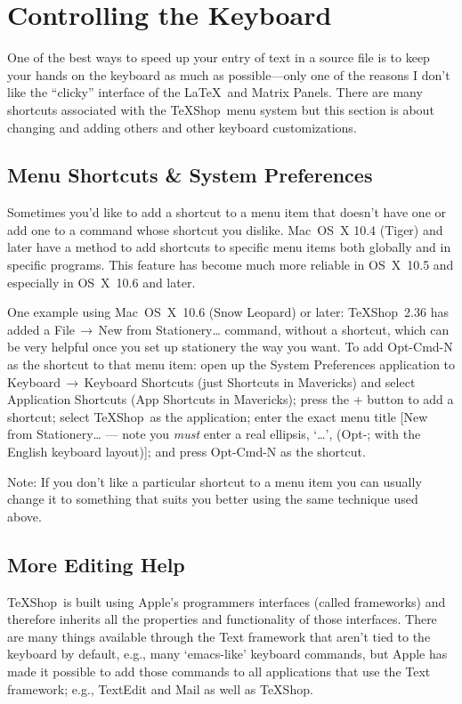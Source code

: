 \documentclass[letterpaper,11pt]{article}
\newcommand{\TS}{\textsf{\TeX Shop}}
\newcommand{\cmd}[1]{\textsf{#1}}
\newcommand{\mnu}[1]{\textsf{#1}}
\newcommand{\To}{\,\(\to\)\,}
\begin{document}
\section{Controlling the Keyboard}

One of the best ways to speed up your entry of text in a source file is to keep your hands on the keyboard as much as possible---only one of the reasons I don't like the ``clicky'' interface of the \LaTeX\ and Matrix Panels. There are many shortcuts associated with the \TS\ menu system but this section is about changing and adding others and other keyboard customizations.

\subsection{Menu Shortcuts \& System Preferences}

Sometimes you'd like to add a shortcut to a menu item that doesn't have one or add one to a command whose shortcut you dislike. Mac~OS~X 10.4 (Tiger) and later have a method to add shortcuts to specific menu items both globally and in specific programs. This feature has become much more reliable in OS~X~10.5 and especially in OS~X~10.6 and later.

One example using Mac~OS~X~10.6 (Snow Leopard) or later: \TS\ 2.36 has added a \mnu{File}\To\mnu{New from Stationery…} command, without a shortcut, which can be very helpful once you set up stationery the way you want. To add \cmd{Opt-Cmd-N} as the shortcut to that menu item: open up the \textsf{System Preferences} application to \mnu{Keyboard}\To\mnu{Keyboard Shortcuts} (just \mnu{Shortcuts} in \cmd{Mavericks}) and select \mnu{Application Shortcuts} (\mnu{App Shortcuts} in \cmd{Mavericks}); press the \mnu{+} button to add a shortcut; select \TS\ as the application; enter the exact menu title [\mnu{New from Stationery…} --- note you \emph{must} enter a real ellipsis, `…', (\cmd{Opt-;} with the English keyboard layout)]; and press \cmd{Opt-Cmd-N} as the shortcut.

Note: If you don't like a particular shortcut to a menu item you can usually change it to something that suits you better using the same technique used above.

\subsection{More Editing Help}

\TS\ is built using Apple's programmers interfaces (called frameworks) and therefore inherits all the properties and functionality of those interfaces. There are many things available through the Text framework that aren't tied to the keyboard by default, e.g., many `\cmd{emacs}-like' keyboard commands, but Apple has made it possible to add those commands to all applications that use the Text framework; e.g., \textsf{TextEdit} and \textsf{Mail} as well as \TS.
\end{document}
